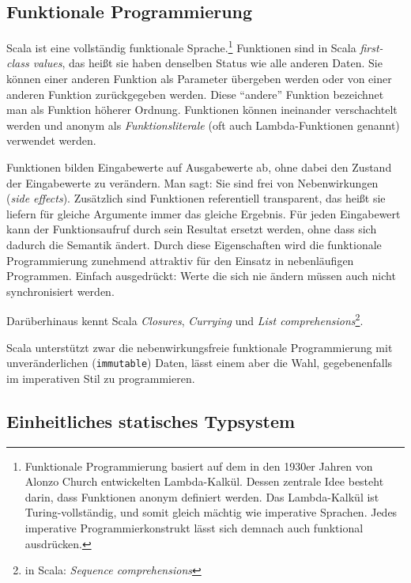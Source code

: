 \documentclass[a4paper, 12pt, listof=totoc, bibliography=totoc]{scrreprt}
\begin{document}
\subsection{Funktionale Programmierung}


Scala ist eine vollständig funktionale Sprache.\footnote{
	Funktionale Programmierung basiert auf dem in den 1930er Jahren von Alonzo Church entwickelten Lambda-Kalkül. Dessen zentrale Idee besteht darin, dass Funktionen anonym definiert werden. Das Lambda-Kalkül ist Turing-vollständig, und somit gleich mächtig wie imperative Sprachen. Jedes imperative Programmierkonstrukt lässt sich demnach auch funktional ausdrücken.}
Funktionen sind in Scala \textit{first-class values}, das heißt sie haben denselben Status wie alle anderen Daten. Sie können einer anderen Funktion als Parameter übergeben werden oder von einer anderen Funktion zurückgegeben werden. Diese "`andere"' Funktion bezeichnet man als Funktion höherer Ordnung. Funktionen können ineinander verschachtelt werden und anonym als \textit{Funktionsliterale} (oft auch Lambda-Funktionen genannt) verwendet werden.

Funktionen bilden Eingabewerte auf Ausgabewerte ab, ohne dabei den Zustand der Eingabewerte zu verändern. Man sagt: Sie sind frei von Nebenwirkungen (\textit{side effects}). Zusätzlich sind Funktionen referentiell transparent, das heißt sie liefern für gleiche Argumente immer das gleiche Ergebnis. Für jeden Eingabewert kann der Funktionsaufruf durch sein Resultat ersetzt werden, ohne dass sich dadurch die Semantik ändert. Durch diese Eigenschaften wird die funktionale Programmierung zunehmend attraktiv für den Einsatz in nebenläufigen Programmen. Einfach ausgedrückt: Werte die sich nie ändern müssen auch nicht synchronisiert werden.

Darüberhinaus kennt Scala \textit{Closures}, \textit{Currying} und \textit{List comprehensions}\footnote{
	in Scala: \textit{Sequence comprehensions}
}.

Scala unterstützt zwar die nebenwirkungsfreie funktionale Programmierung mit unveränderlichen (\texttt{immutable}) Daten, lässt einem aber die Wahl, gegebenenfalls im imperativen Stil zu programmieren.\cite[S. 6 ff.]{piepmeyer2010.GFP}\cite[S. 10 ff.]{odersky2008.PIS}

\subsection{Einheitliches statisches Typsystem}
\end{document}
